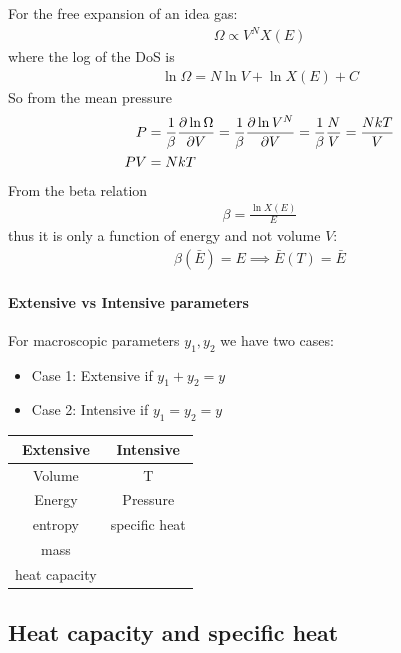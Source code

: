 \documentclass[../main.tex]{subfiles}
\begin{document}
For the free expansion of an idea gas:
\begin{align*}
    \Omega \propto V^N X(E)
\end{align*}
where the log of the DoS is
\begin{align*}
    \ln \Omega = N \ln V + \ln X(E) + C
\end{align*}
So from the mean pressure
\begin{align*}
    P &= \frac{1}{\beta} \pdv{\ln \Omega}{V} = \frac{1}{\beta} \pdv{\ln V^N}{V} = \frac{1}{\beta} \frac{N}{V} = \frac{NkT}{V} \\
    PV &= NkT
\end{align*}
From the beta relation
\begin{align*}
    \beta = \frac{\ln X(E)}{E}
\end{align*}
thus it is only a function of energy and not volume $V$:
\begin{align*}
    \beta (\bar E) = E \implies \bar E(T) = \bar E
\end{align*}

\newpage
\paragraph{Extensive vs Intensive parameters}

For macroscopic parameters $y_1, y_2$ we have two cases:
\begin{itemize}
    \item Case 1: Extensive if $y_1 + y_2 = y$
    \item Case 2: Intensive if $y_1 = y_2 = y$
\end{itemize}
\begin{table}[ht]
    \centering
    \begin{tabular}{c|c}
        Extensive & Intensive \\
        \hline
        Volume & T \\
        Energy & Pressure \\
        entropy & specific heat \\
        mass \\
        heat capacity
    \end{tabular}
\end{table}

\subsection{Heat capacity and specific heat}
\end{document}
